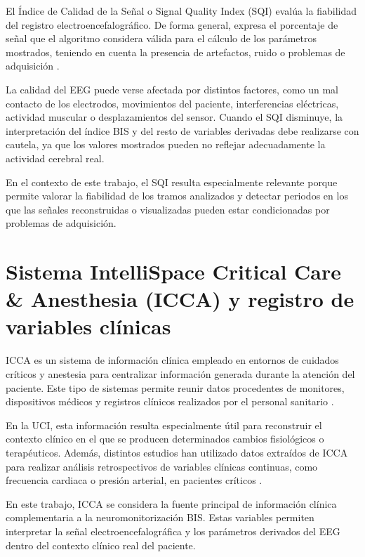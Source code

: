 \documentclass[
  spanish,
  a4paper,
  12pt,
  twoside]{memoir}
\begin{document}
El Índice de Calidad de la Señal o Signal Quality Index (SQI) evalúa la
fiabilidad del registro electroencefalográfico. De forma general,
expresa el porcentaje de señal que el algoritmo considera válida para el
cálculo de los parámetros mostrados, teniendo en cuenta la presencia de
artefactos, ruido o problemas de adquisición \citep{SaboyaSnchez2009}.

La calidad del EEG puede verse afectada por distintos factores, como un
mal contacto de los electrodos, movimientos del paciente, interferencias
eléctricas, actividad muscular o desplazamientos del sensor. Cuando el
SQI disminuye, la interpretación del índice BIS y del resto de variables
derivadas debe realizarse con cautela, ya que los valores mostrados
pueden no reflejar adecuadamente la actividad cerebral real.

En el contexto de este trabajo, el SQI resulta especialmente relevante
porque permite valorar la fiabilidad de los tramos analizados y detectar
periodos en los que las señales reconstruidas o visualizadas pueden
estar condicionadas por problemas de adquisición.

\section{Sistema IntelliSpace Critical Care \& Anesthesia (ICCA) y
registro de variables
clínicas}\label{sistema-intellispace-critical-care-anesthesia-icca-y-registro-de-variables-cluxednicas}

ICCA es un sistema de información clínica empleado en entornos de
cuidados críticos y anestesia para centralizar información generada
durante la atención del paciente. Este tipo de sistemas permite reunir
datos procedentes de monitores, dispositivos médicos y registros
clínicos realizados por el personal sanitario \citep{Lai2022}.

En la UCI, esta información resulta especialmente útil para reconstruir
el contexto clínico en el que se producen determinados cambios
fisiológicos o terapéuticos. Además, distintos estudios han utilizado
datos extraídos de ICCA para realizar análisis retrospectivos de
variables clínicas continuas, como frecuencia cardiaca o presión
arterial, en pacientes críticos \citep{Laichinger2024, Mengel2025}.

En este trabajo, ICCA se considera la fuente principal de información
clínica complementaria a la neuromonitorización BIS. Estas variables
permiten interpretar la señal electroencefalográfica y los parámetros
derivados del EEG dentro del contexto clínico real del paciente.
\end{document}
